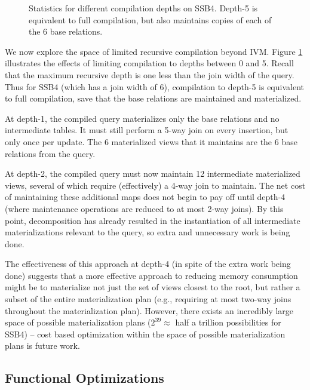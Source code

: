 \begin{figure}
\begin{center}

\caption{Statistics for different compilation depths on SSB4.  Depth-5 is equivalent to full compilation, but also maintains copies of each of the 6 base relations.}
\label{fig:experiments:ssb4depth}
\end{center}
\end{figure}
We now explore the space of limited recursive compilation beyond IVM.  Figure \ref{fig:experiments:ssb4depth} illustrates the effects of limiting compilation to depths between 0 and 5.  Recall that the maximum recursive depth is one less than the join width of the query.  Thus for SSB4 (which has a join width of 6), compilation to depth-5 is equivalent to full compilation, save that the base relations are maintained and materialized.

At depth-1, the compiled query materializes only the base relations and no intermediate tables.  It must still perform a 5-way join on every insertion, but  only once per update.  The 6 materialized views that it maintains are the 6 base relations from the query.  

At depth-2, the compiled query must now maintain 12 intermediate materialized views, several of which require (effectively) a 4-way join to maintain.  The net cost of maintaining these additional maps does not begin to pay off until depth-4 (where maintenance operations are reduced to at most 2-way joins).  By this point, decomposition has already resulted in the instantiation of all intermediate materializations relevant to the query, so extra and unnecessary work is being done.  

The effectiveness of this approach at depth-4 (in spite of the extra work being done) suggests that a more effective approach to reducing memory consumption might be to materialize not just the set of views closest to the root, but rather a subset of the entire materialization plan (e.g., requiring at most two-way joins throughout the materialization plan).  However, there exists an incredibly large space of possible materialization plans ($2^{39} \approx $ half a trillion possibilities for SSB4) -- cost based optimization within the space of possible materialization plans is future work.

\subsection{Functional Optimizations}

